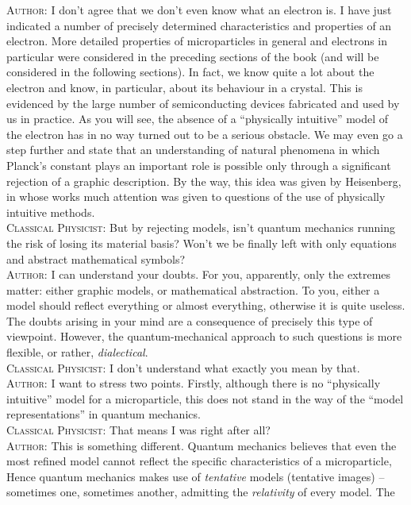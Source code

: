 \documentclass[a4paper,sfsidenotes,colorlinks=true]{tufte-book}
\numberwithin{equation}{section}
\numberwithin{figure}{section}
\begin{document}
\textsc{Author:} I don't agree that we don't even know what an
electron is. I have just indicated a number of precisely determined
characteristics and properties of an electron. More detailed
properties of microparticles in general and electrons in particular
were considered in the preceding sections of the book (and will be
considered in the following sections). In fact, we know quite a lot
about the electron and know, in particular, about its behaviour in a
crystal. This is evidenced by the large number of semiconducting
devices fabricated and used by us in practice. As you will see, the
absence of a ``physically intuitive'' model of the electron has in no
way turned out to be a serious obstacle. We may even go a step further
and state that an understanding of natural phenomena in which Planck's
constant plays an important role is possible only through a
significant rejection of a graphic description. By the way, this idea
was given by Heisenberg, in whose works much attention was given to
questions of the use of physically intuitive methods.
\\
\textsc{Classical Physicist:} But by rejecting models, isn't quantum
mechanics running the risk of losing its material basis? Won't we be
finally left with only equations and abstract mathematical symbols?
\\
\textsc{Author:} I can understand your doubts. For you, apparently,
only the extremes matter: either graphic models, or mathematical
abstraction. To you, either a model should reflect everything or
almost everything, otherwise it is quite useless. The doubts arising
in your mind are a consequence of precisely this type of
viewpoint. However, the quantum-mechanical approach to such questions
is more flexible, or rather, \emph{dialectical}.
\\
\textsc{Classical Physicist:} I don't understand what exactly you mean
by that.
\\
\textsc{Author:} I want to stress two points. Firstly, although there
is no ``physically intuitive'' model for a microparticle, this does
not stand in the way of the ``model representations'' in quantum
mechanics.
\\
\textsc{Classical Physicist:} That means I was right after all?
\\
\textsc{Author:} This is something different. Quantum mechanics
believes that even the most refined model cannot reflect the specific
characteristics of a microparticle, Hence quantum mechanics makes use
of \emph{tentative} models (tentative images) -- sometimes one,
sometimes another, admitting the \emph{relativity} of every model. The
\end{document}
